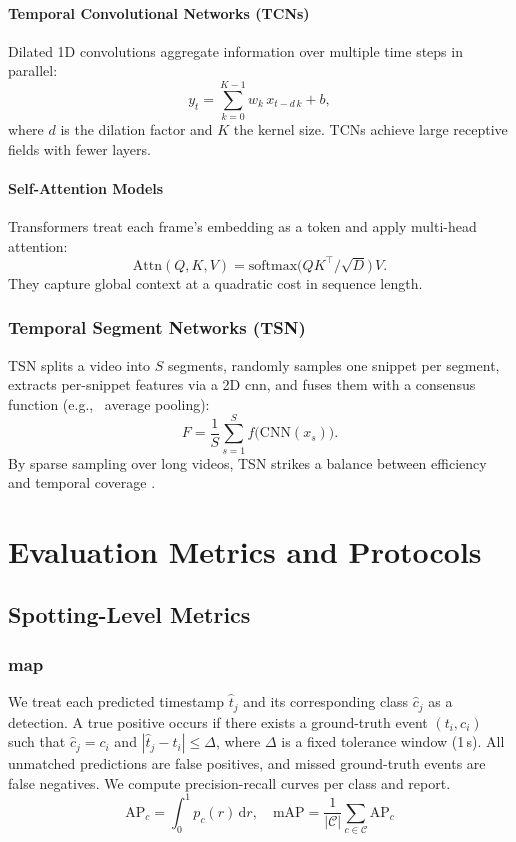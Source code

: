 \paragraph{Temporal Convolutional Networks (TCNs)}  
Dilated 1D convolutions aggregate information over multiple time steps in parallel:
\[
y_t = \sum_{k=0}^{K-1} w_k\,x_{t - d\,k} + b,
\]
where \(d\) is the dilation factor and \(K\) the kernel size. TCNs achieve large receptive fields with fewer layers.

\paragraph{Self-Attention Models}  
Transformers treat each frame's embedding as a token and apply multi-head attention:
\[
\mathrm{Attn}(Q,K,V) = \mathrm{softmax}\bigl(QK^\top/\sqrt{D}\bigr)\,V.
\]
They capture global context at a quadratic cost in sequence length.

\subsubsection{Temporal Segment Networks (TSN)}  
TSN splits a video into \(S\) segments, randomly samples one snippet per segment, extracts per-snippet features via a 2D \acrshort{cnn}, and fuses them with a consensus function (e.g., \ average pooling):
\[
F = \frac{1}{S}\sum_{s=1}^{S}f\bigl(\mathrm{CNN}(x_s)\bigr).
\]
By sparse sampling over long videos, TSN strikes a balance between efficiency and temporal coverage \cite{wang_tsn_2017}.

\section{Evaluation Metrics and Protocols}
\label{sec:evaluation}

\subsection{Spotting-Level Metrics}
\subsubsection{\acrfull{map}}
We treat each predicted timestamp $\hat t_{j}$ and its corresponding class $\hat c_{j}$ as a detection. A true positive occurs if there exists a ground-truth event $(t_{i},c_{i})$ such that $\hat c_{j} = c_{i}$ and $|\hat t_{j} - t_{i}|\le\Delta$, where $\Delta$ is a fixed tolerance window (1\,s). All unmatched predictions are false positives, and missed ground-truth events are false negatives. We compute precision-recall curves per class and report.
\[
\mathrm{AP}_{c} = \int_{0}^{1} p_{c}(r)\,\mathrm{d}r,\quad
\mathrm{mAP} = \frac{1}{|\mathcal{C}|}\sum_{c\in\mathcal{C}}\mathrm{AP}_{c}
\]

